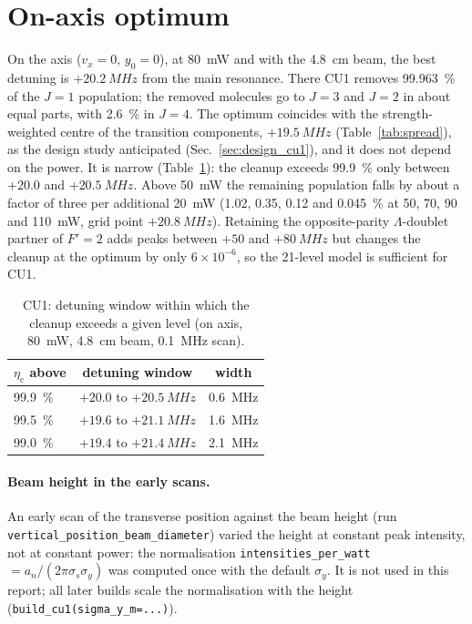 \documentclass[11pt,a4paper,oneside]{report}
\newcommand{\code}[1]{\texttt{#1}}
\newcommand{\etac}{\eta_{\mathrm{c}}}
\newcommand{\sigs}{\sigma_{s}}
\newcommand{\sigy}{\sigma_{y}}
\begin{document}
\section{On-axis optimum}
\label{sec:j1_detuning}

On the axis ($v_x=0$, $y_0=0$), at \SI{80}{mW} and with the \SI{4.8}{cm} beam, the best
detuning is $+\SI{20.2}{MHz}$ from the main resonance. There CU1 removes \SI{99.963}{\percent}
of the $J=1$ population; the removed molecules go to $J=3$ and $J=2$ in about equal parts, with
\SI{2.6}{\percent} in $J=4$. The optimum coincides with the strength-weighted centre of the
transition components, $+\SI{19.5}{MHz}$ (Table~\ref{tab:spread}), as the design study
anticipated (Sec.~\ref{sec:design_cu1}), and it does not depend on the power. It is narrow
(Table~\ref{tab:j1_window}): the cleanup exceeds \SI{99.9}{\percent} only between $+20.0$ and
$+\SI{20.5}{MHz}$. Above \SI{50}{mW} the remaining population falls by about a factor of three
per additional \SI{20}{mW} (1.02, 0.35, 0.12 and \SI{0.045}{\percent} at 50, 70, 90 and
\SI{110}{mW}, grid point $+\SI{20.8}{MHz}$). Retaining the opposite-parity $\Lambda$-doublet
partner of $F'=2$ adds peaks between $+50$ and $+\SI{80}{MHz}$ but changes the cleanup at the
optimum by only $6\times10^{-6}$, so the 21-level model is sufficient for CU1.

\begin{table}[htbp]
  \centering
  \caption[CU1: width of the detuning optimum]{CU1: detuning window within which the
  cleanup exceeds a given level (on axis, \SI{80}{mW}, \SI{4.8}{cm} beam, \SI{0.1}{MHz} scan).}
  \label{tab:j1_window}
  \small
  \begin{tabular}{lcc}
    \toprule
    $\etac$ above & detuning window & width \\
    \midrule
    \SI{99.9}{\percent} & $+20.0$ to $+\SI{20.5}{MHz}$ & \SI{0.6}{MHz} \\
    \SI{99.5}{\percent} & $+19.6$ to $+\SI{21.1}{MHz}$ & \SI{1.6}{MHz} \\
    \SI{99.0}{\percent} & $+19.4$ to $+\SI{21.4}{MHz}$ & \SI{2.1}{MHz} \\
    \bottomrule
  \end{tabular}
\end{table}

\paragraph{Beam height in the early scans.}
\label{sec:j1_geometry}
An early scan of the transverse position against the beam height (run
\code{vertical\_position\_beam\_diameter}) varied the height at constant peak intensity, not at
constant power: the normalisation \code{intensities\_per\_watt}${}=a_n/(2\pi\sigs\sigy)$ was
computed once with the default $\sigy$. It is not used in this report; all later builds scale the
normalisation with the height (\code{build\_cu1(sigma\_y\_m=...)}).
\end{document}
